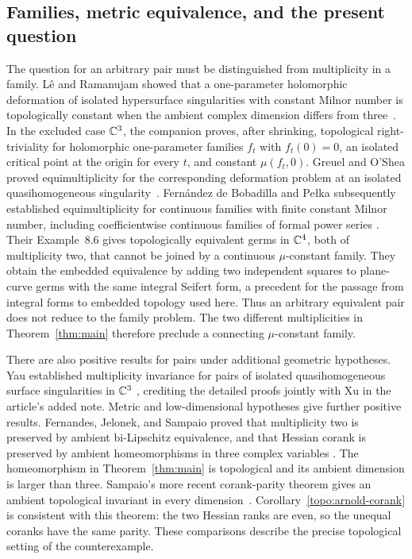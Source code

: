 \subsection*{Families, metric equivalence, and the present question}

The question for an arbitrary pair must be distinguished from
multiplicity in a family. L\^e and Ramanujam showed that a one-parameter holomorphic deformation
of isolated hypersurface singularities with constant Milnor number is
topologically constant when the ambient complex dimension differs from
three~\cite{LeRamanujam1976}. In the excluded case $\mathbb C^3$, the companion
\cite[Theorem~1.1]{OpenAIMuConstant2026} proves, after shrinking,
topological right-triviality for holomorphic one-parameter families $f_t$ with
$f_t(0)=0$, an isolated critical point at the origin for every $t$,
and constant $\mu(f_t,0)$.
Greuel and O'Shea proved equimultiplicity
for the corresponding deformation problem at an isolated quasihomogeneous
singularity~\cite{Greuel1986,OShea1987}. Fern\'andez de Bobadilla and
Pe\l ka subsequently established equimultiplicity for continuous
families with finite constant Milnor number, including coefficientwise
continuous families of formal power series
\cite[Theorem~1.1 and Corollary~1.3]{BobadillaPelka2022}.
Their Example~8.6 gives topologically equivalent germs in $\mathbb C^4$, both
of multiplicity two, that cannot be joined by a continuous
$\mu$-constant family. They obtain the embedded equivalence by adding
two independent squares to plane-curve germs with the same integral
Seifert form, a precedent for the passage from integral forms to
embedded topology used here.
Thus an arbitrary equivalent pair does not
reduce to the family problem. The two different multiplicities in
Theorem~\ref{thm:main} therefore preclude a connecting $\mu$-constant
family.

There are also positive results for pairs under additional geometric
hypotheses. Yau established multiplicity invariance for pairs of isolated
quasihomogeneous surface singularities in $\mathbb C^3$
\cite[Theorem~C]{Yau1988}, crediting the detailed proofs jointly with
Xu in the article's added note. Metric and low-dimensional hypotheses
give further positive results. Fernandes, Jelonek, and Sampaio proved that multiplicity two is preserved
by ambient bi-Lipschitz equivalence, and that Hessian corank is preserved
by ambient homeomorphisms in three complex variables
\cite[Corollary~3.5 and Theorem~4.4]{FernandesJelonekSampaio2025}.
The homeomorphism in Theorem~\ref{thm:main} is topological and its
ambient dimension is larger than three. Sampaio's more recent
corank-parity theorem gives an ambient topological invariant in every
dimension~\cite[Theorem~4.1]{Sampaio2026}.
Corollary~\ref{topo:arnold-corank} is consistent with this theorem:
the two Hessian ranks are even, so the unequal coranks have the same parity.
These comparisons describe the precise topological setting of the
counterexample.

